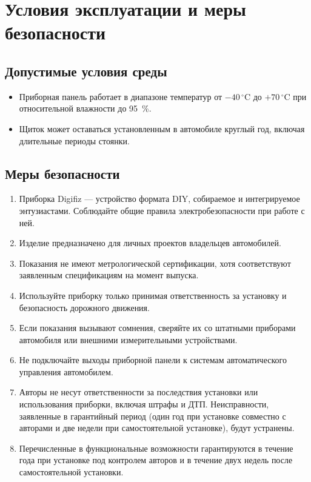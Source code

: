 \chapter{Условия эксплуатации и меры безопасности}\label{ch:safety-ru}

\section{Допустимые условия среды}
\begin{itemize}
    \item Приборная панель работает в диапазоне температур от \(-40\,^{\circ}\mathrm{C}\) до \(+70\,^{\circ}\mathrm{C}\) при относительной влажности до 95~\%.
    \item Щиток может оставаться установленным в автомобиле круглый год, включая длительные периоды стоянки.
\end{itemize}

\section{Меры безопасности}
\begin{enumerate}
    \item Приборка Digifiz — устройство формата DIY, собираемое и интегрируемое энтузиастами. Соблюдайте общие правила электробезопасности при работе с ней.
    \item Изделие предназначено для личных проектов владельцев автомобилей.
    \item Показания не имеют метрологической сертификации, хотя соответствуют заявленным спецификациям на момент выпуска.
    \item Используйте приборку только принимая ответственность за установку и безопасность дорожного движения.
    \item Если показания вызывают сомнения, сверяйте их со штатными приборами автомобиля или внешними измерительными устройствами.
    \item Не подключайте выходы приборной панели к системам автоматического управления автомобилем.
    \item Авторы не несут ответственности за последствия установки или использования приборки, включая штрафы и ДТП. Неисправности, заявленные в гарантийный период (один год при установке совместно с авторами и две недели при самостоятельной установке), будут устранены.
    \item Перечисленные в  функциональные возможности гарантируются в течение года при установке под контролем авторов и в течение двух недель после самостоятельной установки.
\end{enumerate}
